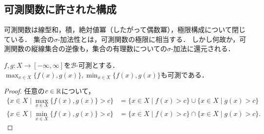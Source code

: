 \documentclass[uplatex, dvipdfmx]{jsreport}
\renewcommand{\B}{\mathcal{B}}
\begin{document}
\subsection{可測関数に許された構成}

\begin{tcolorbox}[colframe=ForestGreen, colback=ForestGreen!10!white,breakable,colbacktitle=ForestGreen!40!white,coltitle=black,fonttitle=\bfseries\sffamily,
title=]
    可測関数は線型和，積，絶対値冪（したがって偶数冪），極限構成について閉じている．
    集合の$\sigma$-加法性とは，可測関数の極限に相当する．
    しかし何故か，可測関数の縦線集合の逆像も，集合の有理数についての$\sigma$-加法に還元される．
\end{tcolorbox}

\begin{proposition}
    $f,g:X\to[-\infty,\infty]$を$\B$-可測とする．$\max_{x\in X}\{f(x),g(x)\},\min_{x\in X}\{f(x),g(x)\}$も可測である．
\end{proposition}
\begin{proof}
    任意の$c\in\mathbb{R}$について，
    \begin{align*}
        \{x\in X\mid\max_{x\in X}\{f(x),g(x)\}>c\}&=\{x\in X\mid f(x)>c\}\cup\{x\in X\mid g(x)>c\}\\
        \{x\in X\mid\min_{x\in X}\{f(x),g(x)\}>c\}&=\{x\in X\mid f(x)>c\}\cap\{x\in X\mid g(x)>c\}.
    \end{align*}
\end{proof}
\end{document}
